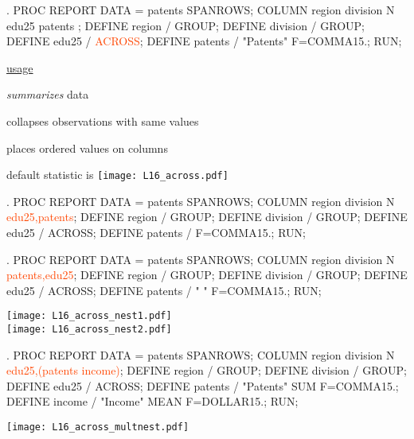\begin{frame}[fragile]
\hspace*{-0.3in}
\begin{code}{.}
PROC REPORT DATA = patents SPANROWS;
   COLUMN region division N edu25 patents ;
   DEFINE region / GROUP;
   DEFINE division / GROUP;
   DEFINE edu25 / \textcolor{OrangeRed}{ACROSS};
   DEFINE patents / "Patents" F=COMMA15.;
RUN;
\end{code}
\emp
\blankcolumn
{}
\underline{ usage}
\bi
\item \emph{summarizes} data
\item collapses observations with same values
\item places ordered values on columns
\item default statistic is 
\ei
\emp
\vspace{5pt}
\texttt{[image: L16\_across.pdf]}
\end{frame}


\begin{frame}[fragile]
\hspace*{-0.3in}
\begin{code}{.}
PROC REPORT DATA = patents SPANROWS;
   COLUMN region division N \textcolor{OrangeRed}{edu25,patents};
   DEFINE region / GROUP;
   DEFINE division / GROUP;
   DEFINE edu25 / ACROSS;
   DEFINE patents /  F=COMMA15.;
RUN;
\end{code}
\begin{code}{.}
PROC REPORT DATA = patents SPANROWS;
   COLUMN region division N \textcolor{OrangeRed}{patents,edu25};
   DEFINE region / GROUP;
   DEFINE division / GROUP;
   DEFINE edu25 / ACROSS;
   DEFINE patents / " " F=COMMA15.;
RUN;
\end{code}
\emp
\blankcolumn
{}
\texttt{[image: L16\_across\_nest1.pdf]}\\
\vskip25pt
\texttt{[image: L16\_across\_nest2.pdf]}
\emp
\end{frame}

\begin{frame}[fragile]
\begin{code}{.}
PROC REPORT DATA = patents SPANROWS;
   COLUMN region division N \textcolor{OrangeRed}{edu25,(patents income)};
   DEFINE region / GROUP;
   DEFINE division / GROUP;
   DEFINE edu25 / ACROSS;
   DEFINE patents / "Patents" SUM  F=COMMA15.;
   DEFINE income /  "Income" MEAN F=DOLLAR15.;
RUN;
\end{code}
\emp
\vspace{5pt}
\texttt{[image: L16\_across\_multnest.pdf]}\\
\end{frame}


